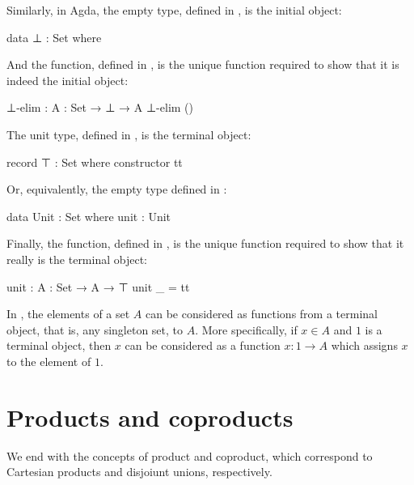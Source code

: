 \begin{example}
  \label{ex:initial-terminal-objects-agda}

  Similarly, in Agda, the empty type, defined in ,
  is the initial object:
  \begin{codeagda}
data ⊥ : Set where
  \end{codeagda}
  And the  function, defined in
  , is the unique function required to show
  that it is indeed the initial object:
  \begin{codeagda}
⊥-elim : {A : Set} → ⊥ → A
⊥-elim ()
  \end{codeagda}
  The unit type, defined in , is the terminal
  object:
  \begin{codeagda}
record ⊤ : Set where
  constructor tt
  \end{codeagda}
  Or, equivalently, the empty type defined in :
  \begin{codeagda}
data Unit : Set where
  unit : Unit
  \end{codeagda}
  Finally, the  function, defined in
  , is the unique function required to show
  that it really is the terminal object:
  \begin{codeagda}
unit : {A : Set} → A → ⊤
unit _ = tt
  \end{codeagda}

\end{example}

\begin{example}
  \label{ex:terminal-objects-constants}


  In \set, the elements of a set $A$ can be considered as functions
  from a terminal object, that is, any singleton set, to $A$. More
  specifically, if $x \in A$ and $1$ is a terminal object, then $x$
  can be considered as a function $x: 1 \to A$ which assigns $x$ to
  the element of $1$.

\end{example}

\section{Products and coproducts}
\label{sec:constructions-products-coproducts}

We end with the concepts of product and coproduct, which correspond to
Cartesian products and disjoiunt unions, respectively.

